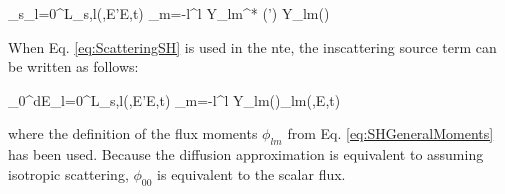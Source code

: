 \beq
\label{eq:ScatteringSH}
\Sigma_s\seatout \equiv\sum_{l=0}^L\Sigma_{s,l}(,E'\rightarrow E,t) \sum_{m=-l}^{l} Y_{lm}^{*} (\hO  ') Y_{lm}(\hO  )
\eeq

When Eq. \eqref{eq:ScatteringSH} is used in the \gls{nte}, the inscattering source term can be written as follows:

\beq
\label{eq:SHInscattering}
\int_0^\infty dE\sum_{l=0}^L\Sigma_{s,l}(,E'\rightarrow E,t) \sum_{m=-l}^{l}  Y_{lm}(\hO  )\phi_{lm}(,E,t)
\eeq

 where the definition of the flux moments \(\phi_{lm}\) from Eq. \eqref{eq:SHGeneralMoments} has been used. Because the diffusion approximation is equivalent to assuming isotropic scattering, \(\phi_{00}\) is equivalent to the scalar flux.
